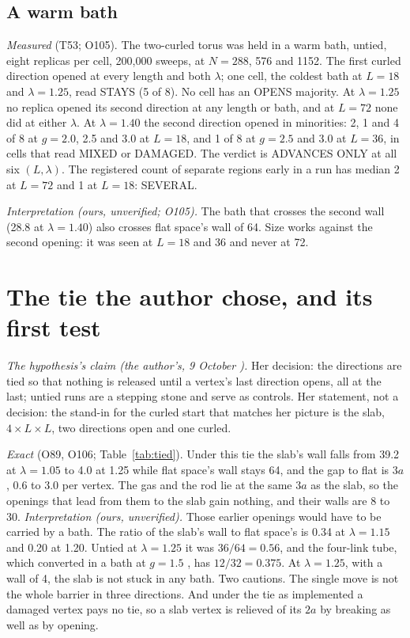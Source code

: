 \documentclass[aps,pre,10pt,twocolumn,superscriptaddress,nofootinbib]{revtex4-2}
\begin{document}
\subsection{A warm bath}

\emph{Measured} (T53; O105). The two-curled torus was held in a warm bath, untied, eight replicas per cell, 200,000
sweeps, at $N = 288$, 576 and 1152. The first curled direction opened at every length and both $\lambda$; one cell,
the coldest bath at $L = 18$ and $\lambda = 1.25$, read STAYS (5 of 8). No cell has an OPENS majority. At
$\lambda = 1.25$ no replica opened its second direction at any length or bath, and at $L = 72$ none did at either
$\lambda$. At $\lambda = 1.40$ the second direction opened in minorities: 2, 1 and 4 of 8 at $g = 2.0$, 2.5 and 3.0
at $L = 18$, and 1 of 8 at $g = 2.5$ and 3.0 at $L = 36$, in cells that read MIXED or DAMAGED. The verdict is
ADVANCES ONLY at all six $(L, \lambda)$. The registered count of separate regions early in a run has median 2 at
$L = 72$ and 1 at $L = 18$: SEVERAL.

\emph{Interpretation (ours, unverified; O105).} The bath that crosses the second wall (28.8 at $\lambda = 1.40$)
also crosses flat space's wall of 64. Size works against the second opening: it was seen at $L = 18$ and 36 and
never at 72.

\section{The tie the author chose, and its first test}
\label{sec:tie}

\emph{The hypothesis's claim (the author's, 9 October \cite{repo}).} Her decision: the directions are tied so that
nothing is released until a vertex's last direction opens, all at the last; untied runs are a stepping stone and
serve as controls. Her statement, not a decision: the stand-in for the curled start that matches her picture is the
slab, $4 \times L \times L$, two directions open and one curled.

\emph{Exact} (O89, O106; Table~\ref{tab:tied}). Under this tie the slab's wall falls from 39.2 at $\lambda = 1.05$
to 4.0 at 1.25 while flat space's wall stays 64, and the gap to flat is $3a$, 0.6 to 3.0 per vertex. The gas and the
rod lie at the same $3a$ as the slab, so the openings that lead from them to the slab gain nothing, and their walls
are 8 to 30. \emph{Interpretation (ours, unverified).} Those earlier openings would have to be carried by a bath. The
ratio of the slab's wall to flat space's is 0.34 at $\lambda = 1.15$ and 0.20 at 1.20. Untied at $\lambda = 1.25$
it was $36/64 = 0.56$, and the four-link tube, which converted in a bath at $g = 1.5$ \cite{paper1}, has
$12/32 = 0.375$. At $\lambda = 1.25$, with a wall of 4, the slab is not stuck in any bath. Two cautions. The single
move is not the whole barrier in three directions. And under the tie as implemented a damaged vertex pays no tie, so
a slab vertex is relieved of its $2a$ by breaking as well as by opening.
\end{document}
